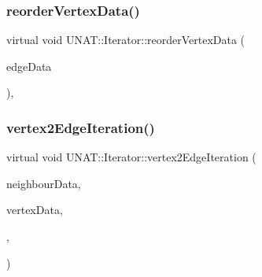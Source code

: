 \mbox{\label{classUNAT_1_1Iterator_a14c39cea873162b0232f55d73b0519ae}} 
\subsubsection{\texorpdfstring{reorderVertexData()}{reorderVertexData()}\hspace{0.1cm}{\footnotesize\ttfamily [2/2]}}
{\footnotesize\ttfamily virtual void U\+N\+A\+T\+::\+Iterator\+::reorder\+Vertex\+Data (\begin{DoxyParamCaption}\item[{\mbox{\hyperlink{structArrays}{Arrays}} $\ast$}]{edge\+Data }\end{DoxyParamCaption})\hspace{0.3cm}{\ttfamily [inline]}, {\ttfamily [virtual]}}

\mbox{\label{classUNAT_1_1Iterator_a0bb9f9c408c19b3c6bb342d37b333a1c}} 
\subsubsection{\texorpdfstring{vertex2EdgeIteration()}{vertex2EdgeIteration()}\hspace{0.1cm}{\footnotesize\ttfamily [1/2]}}
{\footnotesize\ttfamily virtual void U\+N\+A\+T\+::\+Iterator\+::vertex2\+Edge\+Iteration (\begin{DoxyParamCaption}\item[{\mbox{\hyperlink{structArrays}{Arrays}} $\ast$}]{neighbour\+Data,  }\item[{\mbox{\hyperlink{structArrays}{Arrays}} $\ast$}]{vertex\+Data,  }\item[{\mbox{\hyperlink{test_2directSegment_2iterator_8h_a15a4eedea7b94460153f0a0924c98224}{v2e\+\_\+host\+Fun\+Ptr}}}]{,  }\item[{\mbox{\hyperlink{test_2directSegment_2iterator_8h_acd8809485e3b16adfce1d459f3372671}{v2e\+\_\+slave\+Fun\+Ptr}}}]{ }\end{DoxyParamCaption})\hspace{0.3cm}{\ttfamily [pure virtual]}}



